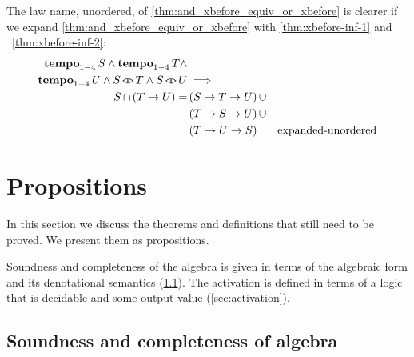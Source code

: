 \documentclass[12pt,openright,twoside,a4paper,oldfontcommands,english,brazil,final]{abntex2}
\theoremstyle{theo}
\def\xbeforeop{\ensuremath\rightarrow}
\newcommand{\xbefore}[2]{\ensuremath #1 \xbeforeop #2 }
\def\tempoop{\ensuremath\operatorname{\mathbf{tempo}}}
\newcommand{\tempo}[2][1-4]{\ensuremath\tempoop_{#1} #2}
\def\independenteventsop{\ensuremath\operatorname{\triangleleft\triangleright}}
\newcommand{\independentevents}[2]{\ensuremath #1 \independenteventsop #2}
\newcommand{\parsin}[1]{\ensuremath\left( #1 \right)}
\def\union{\ensuremath\operatorname{\cup}}
\def\inter{\ensuremath\operatorname{\cap}}
\begin{document}
The law name, unordered, of \eqref{thm:and_xbefore_equiv_or_xbefore} is clearer if we expand \eqref{thm:and_xbefore_equiv_or_xbefore} with \eqref{thm:xbefore-inf-1} and ~\eqref{thm:xbefore-inf-2}:
%
\begin{align}
\tempo{S} \land \tempo{T} \land \nonumber\\
  \tempo{U} \land \independentevents{S}{T} \land \independentevents{S}{U} & \implies \nonumber\\
  S \inter \parsin{\xbefore{T}{U}} = &
  \parsin{\xbefore{\xbefore{S}{T}}{U}} \union \nonumber\\
  & \parsin{\xbefore{\xbefore{T}{S}}{U}} \union \nonumber\\
  & \parsin{\xbefore{\xbefore{T}{U}}{S}} &
  \text{expanded-unordered}
  \label{thm:and_xbefore_equiv_or_xbefore_expanded}
%
%
%
\end{align}
%

\section{Propositions}
\label{sec:propositions}

In this section we discuss the theorems and definitions that still need to be proved.
We present them as propositions.

Soundness and completeness of the \ac{algebra} is given in terms of the algebraic form and its denotational semantics (\cref{sec:soundness-completeness-algebra}).
The \ac{activation} is defined in terms of a logic that is decidable and some output value (\cref{sec:activation}).

\subsection{Soundness and completeness of \acs*{algebra}}
\label{sec:soundness-completeness-algebra}
\end{document}
